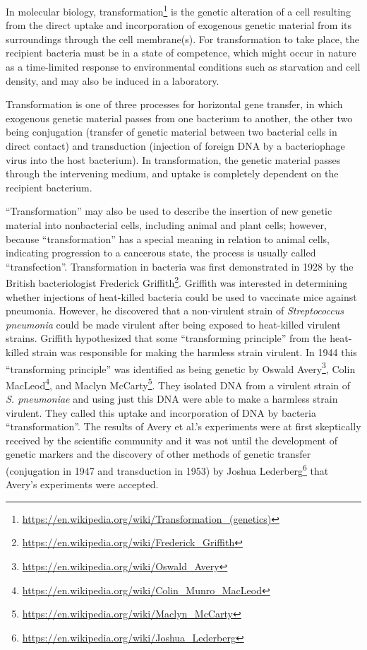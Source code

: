 \documentclass[]{book}
\let\rmarkdownfootnote\footnote%
\def\footnote{\protect\rmarkdownfootnote}
\renewcommand{\href}[2]{#2\footnote{\url{#1}}}
\theoremstyle{definition}
\theoremstyle{definition}
\theoremstyle{definition}
\theoremstyle{remark}
\begin{document}
In molecular biology,
\href{https://en.wikipedia.org/wiki/Transformation_(genetics)}{transformation}
is the genetic alteration of a cell resulting from the direct uptake and
incorporation of exogenous genetic material from its surroundings
through the cell membrane(s). For transformation to take place, the
recipient bacteria must be in a state of competence, which might occur
in nature as a time-limited response to environmental conditions such as
starvation and cell density, and may also be induced in a laboratory.

Transformation is one of three processes for horizontal gene transfer,
in which exogenous genetic material passes from one bacterium to
another, the other two being conjugation (transfer of genetic material
between two bacterial cells in direct contact) and transduction
(injection of foreign DNA by a bacteriophage virus into the host
bacterium). In transformation, the genetic material passes through the
intervening medium, and uptake is completely dependent on the recipient
bacterium.

``Transformation'' may also be used to describe the insertion of new
genetic material into nonbacterial cells, including animal and plant
cells; however, because ``transformation'' has a special meaning in
relation to animal cells, indicating progression to a cancerous state,
the process is usually called ``transfection''. Transformation in
bacteria was first demonstrated in 1928 by the British bacteriologist
\href{https://en.wikipedia.org/wiki/Frederick_Griffith}{Frederick
Griffith}. Griffith was interested in determining whether injections of
heat-killed bacteria could be used to vaccinate mice against pneumonia.
However, he discovered that a non-virulent strain of \emph{Streptococcus
pneumonia} could be made virulent after being exposed to heat-killed
virulent strains. Griffith hypothesized that some ``transforming
principle'' from the heat-killed strain was responsible for making the
harmless strain virulent. In 1944 this ``transforming principle'' was
identified as being genetic by
\href{https://en.wikipedia.org/wiki/Oswald_Avery}{Oswald Avery},
\href{https://en.wikipedia.org/wiki/Colin_Munro_MacLeod}{Colin MacLeod},
and \href{https://en.wikipedia.org/wiki/Maclyn_McCarty}{Maclyn McCarty}.
They isolated DNA from a virulent strain of \emph{S. pneumoniae} and
using just this DNA were able to make a harmless strain virulent. They
called this uptake and incorporation of DNA by bacteria
``transformation''. The results of Avery et al.'s experiments were at
first skeptically received by the scientific community and it was not
until the development of genetic markers and the discovery of other
methods of genetic transfer (conjugation in 1947 and transduction in
1953) by \href{https://en.wikipedia.org/wiki/Joshua_Lederberg}{Joshua
Lederberg} that Avery's experiments were accepted.
\end{document}
